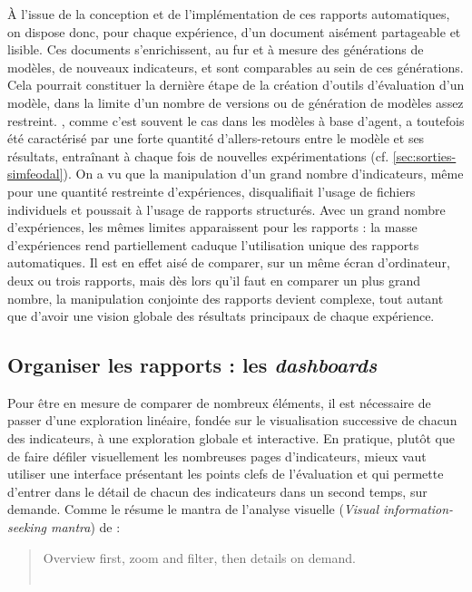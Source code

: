 À l'issue de la conception et de l'implémentation de ces rapports automatiques, on dispose donc, pour chaque expérience, d'un document aisément partageable et lisible.
Ces documents s'enrichissent, au fur et à mesure des générations de modèles, de nouveaux indicateurs, et sont comparables au sein de ces générations.
Cela pourrait constituer la dernière étape de la création d'outils d'évaluation d'un modèle, dans la limite d'un nombre de versions ou de génération de modèles assez restreint.
\simfeodal{}, comme c'est souvent le cas dans les modèles à base d'agent, a toutefois été caractérisé par une forte quantité d'allers-retours entre le modèle et ses résultats, entraînant à chaque fois de nouvelles expérimentations (cf. \cref{sec:sorties-simfeodal}). 
On a vu que la manipulation d'un grand nombre d'indicateurs, même pour une quantité restreinte d'expériences, disqualifiait l'usage de fichiers individuels et poussait à l'usage de rapports structurés.
Avec un grand nombre d'expériences, les mêmes limites apparaissent pour les rapports : la masse d'expériences rend partiellement caduque l'utilisation unique des rapports automatiques.
Il est en effet aisé de comparer, sur un même écran d'ordinateur, deux ou trois rapports, mais dès lors qu'il faut en comparer un plus grand nombre, la manipulation conjointe des rapports devient complexe, tout autant que d'avoir une vision globale des résultats principaux de chaque expérience.

\subsection{Organiser les rapports : les \textit{dashboards}}\label{subsec:dashboards}

Pour être en mesure de comparer de nombreux éléments, il est nécessaire de passer d'une exploration linéaire, fondée sur le visualisation successive de chacun des indicateurs, à une exploration globale et interactive.
En pratique, plutôt que de faire défiler visuellement les nombreuses pages d'indicateurs, mieux vaut utiliser une interface présentant les points clefs de l'évaluation et qui permette d'entrer dans le détail de chacun des indicateurs dans un second temps, sur demande.
Comme le résume le \og mantra\fg{} de l'analyse visuelle (\og \textit{Visual information-seeking mantra}\fg{}) de  :
\begin{quote}
	\centering
	\noindent\og Overview first, zoom and filter, then details on demand\fg{}.\\
	\mbox{}~ \hfill \cite[\ppno~2]{shneiderman1996eyes}
\end{quote}


